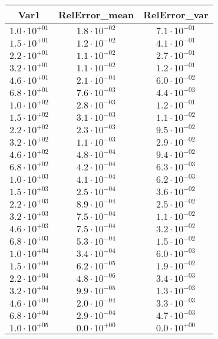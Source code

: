 \begin{tabular}{ccc}
Var1 & RelError_mean & RelError_var \\ 
\hline 
$1.0\cdot 10^{+01}$ & $1.8\cdot 10^{-02}$ & $7.1\cdot 10^{-01}$ \\ 
$1.5\cdot 10^{+01}$ & $1.2\cdot 10^{-02}$ & $4.1\cdot 10^{-01}$ \\ 
$2.2\cdot 10^{+01}$ & $1.1\cdot 10^{-02}$ & $2.7\cdot 10^{-01}$ \\ 
$3.2\cdot 10^{+01}$ & $1.1\cdot 10^{-02}$ & $1.2\cdot 10^{-01}$ \\ 
$4.6\cdot 10^{+01}$ & $2.1\cdot 10^{-04}$ & $6.0\cdot 10^{-02}$ \\ 
$6.8\cdot 10^{+01}$ & $7.6\cdot 10^{-03}$ & $4.4\cdot 10^{-03}$ \\ 
$1.0\cdot 10^{+02}$ & $2.8\cdot 10^{-03}$ & $1.2\cdot 10^{-01}$ \\ 
$1.5\cdot 10^{+02}$ & $3.1\cdot 10^{-03}$ & $1.1\cdot 10^{-02}$ \\ 
$2.2\cdot 10^{+02}$ & $2.3\cdot 10^{-03}$ & $9.5\cdot 10^{-02}$ \\ 
$3.2\cdot 10^{+02}$ & $1.1\cdot 10^{-03}$ & $2.9\cdot 10^{-02}$ \\ 
$4.6\cdot 10^{+02}$ & $4.8\cdot 10^{-04}$ & $9.4\cdot 10^{-02}$ \\ 
$6.8\cdot 10^{+02}$ & $4.2\cdot 10^{-04}$ & $6.3\cdot 10^{-03}$ \\ 
$1.0\cdot 10^{+03}$ & $4.1\cdot 10^{-04}$ & $6.2\cdot 10^{-03}$ \\ 
$1.5\cdot 10^{+03}$ & $2.5\cdot 10^{-04}$ & $3.6\cdot 10^{-02}$ \\ 
$2.2\cdot 10^{+03}$ & $8.9\cdot 10^{-04}$ & $2.5\cdot 10^{-02}$ \\ 
$3.2\cdot 10^{+03}$ & $7.5\cdot 10^{-04}$ & $1.1\cdot 10^{-02}$ \\ 
$4.6\cdot 10^{+03}$ & $7.5\cdot 10^{-04}$ & $3.2\cdot 10^{-02}$ \\ 
$6.8\cdot 10^{+03}$ & $5.3\cdot 10^{-04}$ & $1.5\cdot 10^{-02}$ \\ 
$1.0\cdot 10^{+04}$ & $3.4\cdot 10^{-04}$ & $6.0\cdot 10^{-03}$ \\ 
$1.5\cdot 10^{+04}$ & $6.2\cdot 10^{-05}$ & $1.9\cdot 10^{-02}$ \\ 
$2.2\cdot 10^{+04}$ & $4.8\cdot 10^{-06}$ & $3.4\cdot 10^{-03}$ \\ 
$3.2\cdot 10^{+04}$ & $9.9\cdot 10^{-05}$ & $1.3\cdot 10^{-03}$ \\ 
$4.6\cdot 10^{+04}$ & $2.0\cdot 10^{-04}$ & $3.3\cdot 10^{-03}$ \\ 
$6.8\cdot 10^{+04}$ & $2.9\cdot 10^{-04}$ & $4.7\cdot 10^{-03}$ \\ 
$1.0\cdot 10^{+05}$ & $0.0\cdot 10^{+00}$ & $0.0\cdot 10^{+00}$ \\ 
\hline 
\end{tabular}